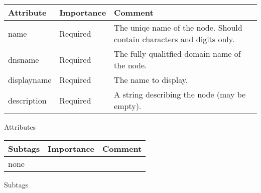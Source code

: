 \documentclass[a4paper]{article}
\begin{document}
    \begin{center}
        \begin{tabular}{ | p{2.1cm} | p{2cm} | p{9cm} |}
        \hline
        \textbf{Attribute} & \textbf{Importance} & \textbf{Comment}  
        \\ \hline
        name & Required & The uniqe name of the node. Should contain characters and digits only.
        \\ \hline
        dnsname & Required & The fully qualitfied domain name of the node.
        \\ \hline
        displayname & Required & The name to display.
        \\ \hline
        description & Required & A string describing the node (may be empty).
        \\ \hline
        \end{tabular}
        \small Attributes
        
        \begin{tabular}{ | p{2.1cm} | p{2cm} | p{9cm} |}
        \hline
        \textbf{Subtags} & \textbf{Importance} & \textbf{Comment}  
        \\ \hline
        none
        & &
        \\ \hline
        \end{tabular}
        
        \small Subtags
    \end{center}        
\end{document}
